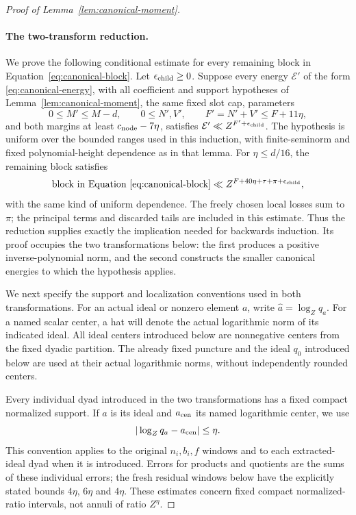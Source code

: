 \documentclass[11pt,a4paper]{article}
\numberwithin{equation}{section}
\numberwithin{figure}{section}
\theoremstyle{definition}
\theoremstyle{remark}
\begin{document}
\begin{proof}[Proof of Lemma~\ref{lem:canonical-moment}]
\paragraph{The two-transform reduction.}
We prove the following conditional estimate for every remaining block
in Equation~\eqref{eq:canonical-block}. Let \(\epsilon_{\rm child}\ge0\).
Suppose every energy \(\mathcal E'\) of the form
\eqref{eq:canonical-energy}, with all coefficient and support hypotheses
of Lemma~\ref{lem:canonical-moment}, the same fixed slot cap, parameters
\[
 0\le M'\le M-d,\qquad 0\le N',V',\qquad F'=N'+V'\le F+11\eta,
\]
and both margins at least \(c_{\rm node}-7\eta\), satisfies
\(\mathcal E'\ll Z^{F'+\epsilon_{\rm child}}\).
The hypothesis is uniform over the bounded ranges used in this induction,
with finite-seminorm and fixed polynomial-height dependence as in that
lemma. For
\(\eta\le d/16\), the remaining block satisfies
\begin{equation}\label{eq:canonical-reduction-contract}
 \text{block in Equation~\eqref{eq:canonical-block}}
 \ll Z^{F+40\eta+\tau+\pi+\epsilon_{\rm child}},
\end{equation}
with the same kind of uniform dependence. The freely chosen local losses
sum to \(\pi\); the principal terms and discarded tails are included
in this estimate. Thus the reduction supplies exactly the implication
needed for backwards induction. Its proof occupies the two transformations
below: the first produces a positive inverse-polynomial norm, and the second
constructs the smaller canonical energies to which the hypothesis applies.

We next specify the support and localization conventions used in both
transformations.  For an actual ideal or nonzero element \(a\), write
\(\widehat a=\log_Zq_a\).  For a named scalar center, a hat will denote
the actual logarithmic norm of its indicated ideal.  All ideal centers
introduced below are nonnegative centers from the fixed dyadic partition.
The already fixed puncture and the ideal \(q_0\) introduced below are used
at their actual logarithmic norms, without independently rounded centers.

Every individual dyad introduced in the two transformations has a fixed
compact normalized support. If \(a\) is its ideal and \(a_{\rm cen}\)
its named logarithmic center, we use
\begin{equation}\label{eq:inverse-ratio-bounds}
 |\log_Zq_a-a_{\rm cen}|\le\eta.
\end{equation}
This convention applies to the original \(n_i,b_i,f\) windows and to
each extracted-ideal dyad when it is introduced. Errors for products
and quotients are the sums of these individual errors; the fresh residual
windows below have the explicitly stated bounds \(4\eta\), \(6\eta\)
and \(4\eta\). These estimates concern fixed compact normalized-ratio
intervals, not annuli of ratio \(Z^\eta\).


\end{proof}
\end{document}
